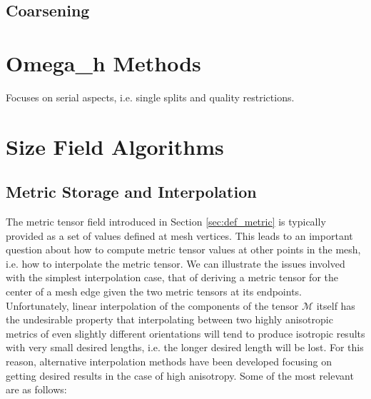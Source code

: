 \subsection{Coarsening}

\section{Omega\_h Methods}
\label{sec:omega_h-adapt}

Focuses on serial aspects, i.e. single splits and
quality restrictions.

\section{Size Field Algorithms}
\label{sec:sf}

\subsection{Metric Storage and Interpolation}

The metric tensor field introduced in Section \ref{sec:def_metric}
is typically provided as a set of values defined at mesh vertices.
This leads to an important question about how to compute metric
tensor values at other points in the mesh, i.e. how to interpolate
the metric tensor.
We can illustrate the issues involved with the simplest interpolation
case, that of deriving a metric tensor for the center of a mesh
edge given the two metric tensors at its endpoints.
Unfortunately, linear interpolation of the components of the
tensor $\mathcal{M}$ itself has the undesirable property that
interpolating between two highly anisotropic metrics of even
slightly different orientations will tend to produce isotropic
results with very small desired lengths, i.e. the longer desired
length will be lost.
For this reason, alternative interpolation methods have been developed
focusing on getting desired results in the case of high anisotropy.
Some of the most relevant are as follows:


